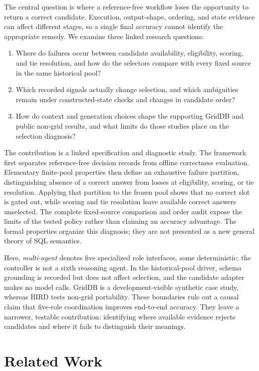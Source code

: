 \documentclass[information,article,submit,moreauthors]{Definitions/mdpi}
\begin{document}
The central question is where a reference-free workflow loses the opportunity to return a correct candidate. Execution, output-shape, ordering, and state evidence can affect different stages, so a single final accuracy cannot identify the appropriate remedy. We examine three linked research questions:
\begin{enumerate}
\item Where do failures occur between candidate availability, eligibility, scoring, and tie resolution, and how do the selectors compare with every fixed source in the same historical pool?
\item Which recorded signals actually change selection, and which ambiguities remain under constructed-state checks and changes in candidate order?
\item How do context and generation choices shape the supporting GridDB and public non-grid results, and what limits do those studies place on the selection diagnosis?
\end{enumerate}

The contribution is a linked specification and diagnostic study. The framework first separates reference-free decision records from offline correctness evaluation. Elementary finite-pool properties then define an exhaustive failure partition, distinguishing absence of a correct answer from losses at eligibility, scoring, or tie resolution. Applying that partition to the frozen pool shows that no correct slot is gated out, while scoring and tie resolution leave available correct answers unselected. The complete fixed-source comparison and order audit expose the limits of the tested policy rather than claiming an accuracy advantage. The formal properties organize this diagnosis; they are not presented as a new general theory of SQL semantics.

Here, \emph{multi-agent} denotes five specialized role interfaces, some deterministic; the controller is not a sixth reasoning agent. In the historical-pool driver, schema grounding is recorded but does not affect selection, and the candidate adapter makes no model calls. GridDB is a development-visible synthetic case study, whereas BIRD tests non-grid portability. These boundaries rule out a causal claim that five-role coordination improves end-to-end accuracy. They leave a narrower, testable contribution: identifying where available evidence rejects candidates and where it fails to distinguish their meanings.

\section{Related Work}
\end{document}
